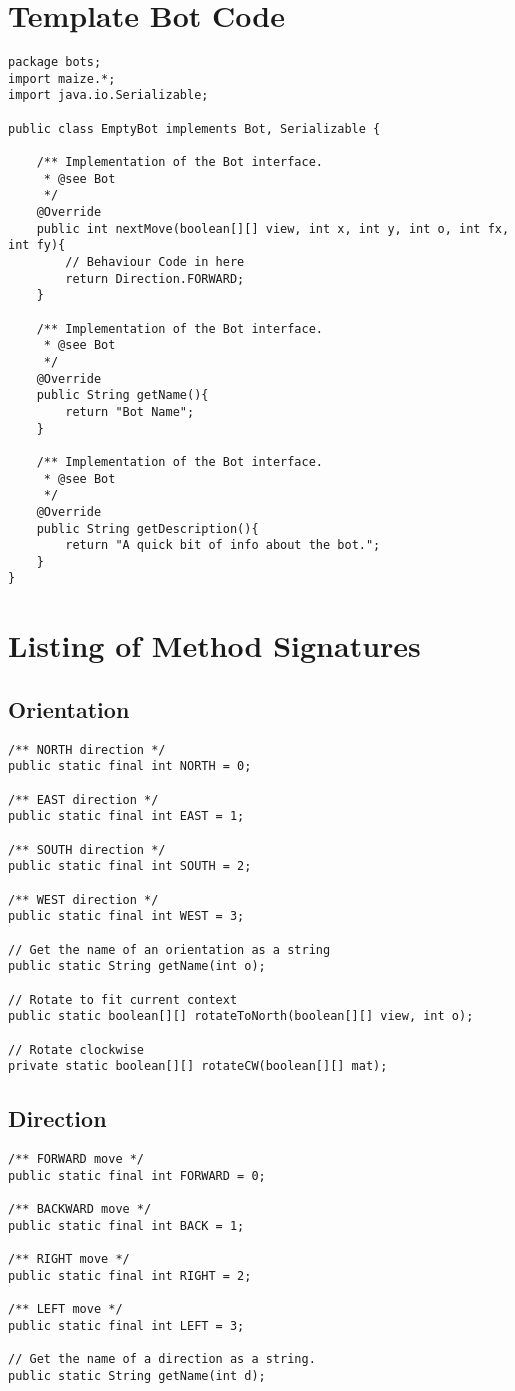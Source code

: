 \documentclass[11pt]{article}
\begin{document}
\pagebreak
\section{Template Bot Code}
\label{section:template}
\begin{lstlisting}
package bots;
import maize.*;
import java.io.Serializable;

public class EmptyBot implements Bot, Serializable {

    /** Implementation of the Bot interface.
     * @see Bot
     */
    @Override
    public int nextMove(boolean[][] view, int x, int y, int o, int fx, int fy){
        // Behaviour Code in here
        return Direction.FORWARD;
    }

    /** Implementation of the Bot interface.
     * @see Bot
     */
    @Override
    public String getName(){
        return "Bot Name";
    }

    /** Implementation of the Bot interface.
     * @see Bot
     */
    @Override
    public String getDescription(){
        return "A quick bit of info about the bot.";
    }
}
\end{lstlisting}


\pagebreak
\appendix
\section{Listing of Method Signatures}
\subsection{Orientation}
\begin{lstlisting}
/** NORTH direction */
public static final int NORTH = 0;

/** EAST direction */
public static final int EAST = 1;

/** SOUTH direction */
public static final int SOUTH = 2;

/** WEST direction */
public static final int WEST = 3;

// Get the name of an orientation as a string
public static String getName(int o);

// Rotate to fit current context
public static boolean[][] rotateToNorth(boolean[][] view, int o);

// Rotate clockwise
private static boolean[][] rotateCW(boolean[][] mat);
\end{lstlisting}


\subsection{Direction}
\begin{lstlisting}
/** FORWARD move */
public static final int FORWARD = 0;

/** BACKWARD move */
public static final int BACK = 1;

/** RIGHT move */
public static final int RIGHT = 2;

/** LEFT move */
public static final int LEFT = 3;

// Get the name of a direction as a string.
public static String getName(int d);
\end{lstlisting}
\end{document}
